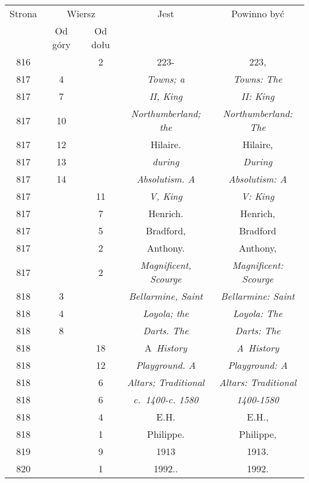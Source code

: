 \documentclass[a4paper,11pt]{article}
\begin{document}
\begin{center}
  \newpage

  \begin{tabular}{|c|c|c|c|c|}
    \hline
    Strona & \multicolumn{2}{c|}{Wiersz} & Jest
                              & Powinno być \\ \cline{2-3}
    & Od góry & Od dołu & & \\
    \hline
    816 & &  2 & 223- & 223, \\
    817 &  4 & & \textit{Towns; a} & \textit{Towns: The} \\
    817 &  7 & & \textit{II, King} & \textit{II: King} \\
    817 & 10 & & \textit{Northumberland; the}
           & \textit{Northumberland: The} \\
    817 & 12 & & Hilaire. & Hilaire, \\
    817 & 13 & & \textit{during} & \textit{During} \\
    817 & 14 & & \textit{Absolutism. A} & \textit{Absolutism: A} \\
    817 & & 11 & \textit{V, King} & \textit{V: King} \\
    817 & &  7 & Henrich. & Henrich, \\
    817 & &  5 & Bradford, & Bradford \\
    817 & &  2 & Anthony. & Anthony, \\
    817 & &  2 & \textit{Magnificent, Scourge}
           & \textit{Magnificent: Scourge} \\
    818 &  3 & & \textit{Bellarmine, Saint} & \textit{Bellarmine: Saint} \\
    818 &  4 & & \textit{Loyola; the} & \textit{Loyola: The} \\
    818 &  8 & & \textit{Darts. The} & \textit{Darts: The} \\
    818 & & 18 & A~\textit{History} & \textit{A~History} \\
    818 & & 12 & \textit{Playground. A} & \textit{Playground: A} \\
    818 & &  6 & \textit{Altars; Traditional}
           & \textit{Altars: Traditional} \\
    818 & &  6 & \textit{c.~1400-c. 1580} & \textit{1400-1580} \\
    818 & &  4 & E.H. & E.H., \\
    818 & &  1 & Philippe. & Philippe, \\
    819 & &  9 & 1913 & 1913. \\
    820 & &  1 & 1992.. & 1992. \\

\end{tabular}
\end{center}
\end{document}
